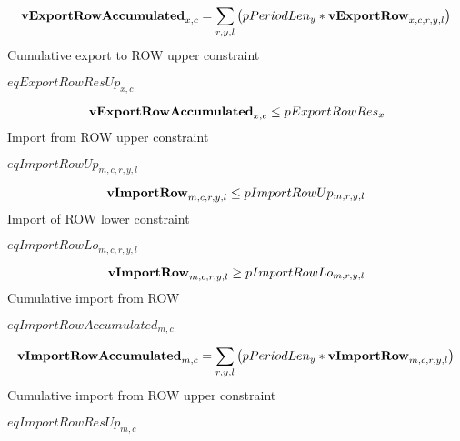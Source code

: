 \documentclass{article}
\begin{document}
\begin{dmath} 
{\bf vExportRowAccumulated}_{x,c}  =  \sum_{r,y,l}{\left(pPeriodLen_{y}*{\bf vExportRow}_{x,c,r,y,l}\right)}
\end{dmath} 
Cumulative export to ROW upper constraint







$eqExportRowResUp_{x,c}$





\begin{dmath} 
{\bf vExportRowAccumulated}_{x,c}  \le  pExportRowRes_{x}
\end{dmath} 
Import from ROW upper constraint







$eqImportRowUp_{m,c,r,y,l}$





\begin{dmath} 
{\bf vImportRow}_{m,c,r,y,l}  \le  pImportRowUp_{m,r,y,l}
\end{dmath} 
Import of ROW lower constraint







$eqImportRowLo_{m,c,r,y,l}$





\begin{dmath} 
{\bf vImportRow}_{m,c,r,y,l}  \ge  pImportRowLo_{m,r,y,l}
\end{dmath} 
Cumulative import from ROW







$eqImportRowAccumulated_{m,c}$





\begin{dmath} 
{\bf vImportRowAccumulated}_{m,c}  =  \sum_{r,y,l}{\left(pPeriodLen_{y}*{\bf vImportRow}_{m,c,r,y,l}\right)}
\end{dmath} 
Cumulative import from ROW upper constraint







$eqImportRowResUp_{m,c}$
\end{document}
